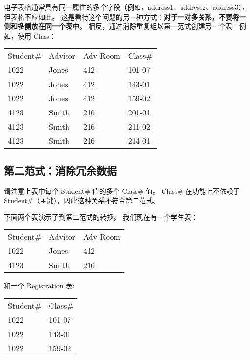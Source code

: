 电子表格通常具有同一属性的多个字段（例如，address1、address2、address3），但表格不应如此。 这是看待这个问题的另一种方式：\textbf{对于一对多关系，不要将一侧和多侧放在同一个表中}。 相反，通过消除重复组以第一范式创建另一个表 - 例如，使用 Class：
\begin{table}[h]
    \centering
    \begin{tabular}{llll}
        Student\# & Advisor & Adv-Room & Class\# \\
        1022      & Jones   & 412      & 101-07  \\
        1022      & Jones   & 412      & 143-01  \\
        1022      & Jones   & 412      & 159-02  \\
        4123      & Smith   & 216      & 201-01  \\
        4123      & Smith   & 216      & 211-02  \\
        4123      & Smith   & 216      & 214-01  \\
    \end{tabular}
\end{table}
\subsection{第二范式：消除冗余数据}
请注意上表中每个 Student\# 值的多个 Class\# 值。 Class\# 在功能上不依赖于 Student\#（主键），因此这种关系不符合第二范式。

下面两个表演示了到第二范式的转换。 我们现在有一个学生表：
\begin{table}[h]
    \centering
    \begin{tabular}{lll}
        Student\# & Advisor & Adv-Room \\
        1022      & Jones   & 412      \\
        4123      & Smith   & 216      \\
    \end{tabular}
\end{table}

和一个 Registration 表:
\begin{table}[h]
    \centering
    \begin{tabular}{ll}
        Student\# & Class\# \\
        1022      & 101-07  \\
        1022      & 143-01  \\
        1022      & 159-02  \\
    \end{tabular}
\end{table}
